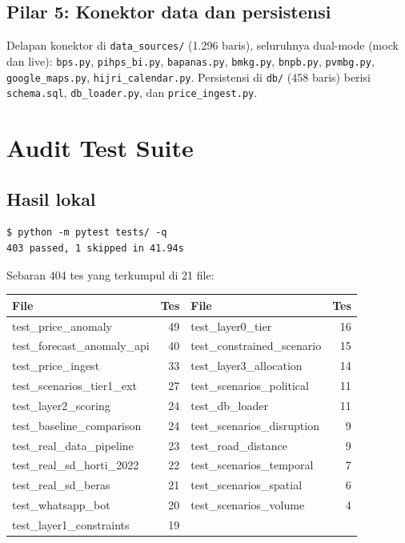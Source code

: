 \documentclass[11pt,a4paper]{article}
\newcommand{\code}[1]{\texttt{\small #1}}
\begin{document}
\subsection{Pilar 5: Konektor data dan persistensi}

Delapan konektor di \code{data\_sources/} (1.296 baris), seluruhnya dual-mode (mock dan live):
\code{bps.py}, \code{pihps\_bi.py}, \code{bapanas.py}, \code{bmkg.py}, \code{bnpb.py},
\code{pvmbg.py}, \code{google\_maps.py}, \code{hijri\_calendar.py}. Persistensi di \code{db/}
(458 baris) berisi \code{schema.sql}, \code{db\_loader.py}, dan \code{price\_ingest.py}.

\section{Audit Test Suite}

\subsection{Hasil lokal}

\begin{lstlisting}
$ python -m pytest tests/ -q
403 passed, 1 skipped in 41.94s
\end{lstlisting}

\noindent
Sebaran 404 tes yang terkumpul di 21 file:

\begin{center}
\begin{tabular}{@{}lr@{\hskip 1.2cm}lr@{}}
\toprule
\textbf{File} & \textbf{Tes} & \textbf{File} & \textbf{Tes} \\
\midrule
test\_price\_anomaly            & 49 & test\_layer0\_tier                  & 16 \\
test\_forecast\_anomaly\_api     & 40 & test\_constrained\_scenario         & 15 \\
test\_price\_ingest             & 33 & test\_layer3\_allocation            & 14 \\
test\_scenarios\_tier1\_ext      & 27 & test\_scenarios\_political          & 11 \\
test\_layer2\_scoring           & 24 & test\_db\_loader                    & 11 \\
test\_baseline\_comparison      & 24 & test\_scenarios\_disruption         & 9 \\
test\_real\_data\_pipeline       & 23 & test\_road\_distance                & 9 \\
test\_real\_sd\_horti\_2022       & 22 & test\_scenarios\_temporal           & 7 \\
test\_real\_sd\_beras            & 21 & test\_scenarios\_spatial            & 6 \\
test\_whatsapp\_bot             & 20 & test\_scenarios\_volume             & 4 \\
test\_layer1\_constraints       & 19 & & \\
\bottomrule
\end{tabular}
\end{center}
\end{document}

